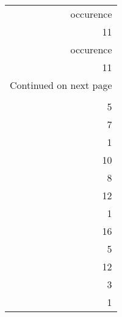 \begin{longtable}{r}
\toprule
 occurence \\
        11 \\
\midrule
\endfirsthead

\toprule
 occurence \\
        11 \\
\midrule
\endhead
\midrule
\multicolumn{1}{r}{{Continued on next page}} \\
\midrule
\endfoot

\bottomrule
\endlastfoot
         1 \\
         5 \\
         7 \\
         1 \\
        10 \\
         8 \\
        12 \\
         1 \\
        16 \\
         5 \\
        12 \\
         3 \\
         1 \\
\end{longtable}
